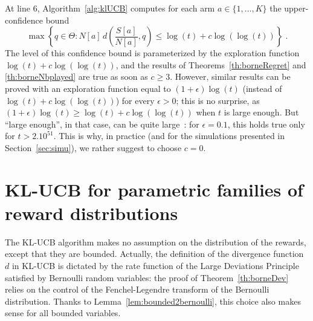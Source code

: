 \documentclass[wcp]{jmlr}
\newcommand{\1}{\mathbbm{1}}
\begin{document}
\begin{remark}
  At line $6$, Algorithm~\ref{alg:klUCB} computes for each arm
  $a\in\{1,\dots,K\}$ the upper-confidence bound
  \[\max\left\{q\in\Theta : N[a] \, d\left( \frac{S[a]}{N[a]}, q \right)
    \leq \log(t) + c\log(\log(t))\right\}\;.\]
  The level of this confidence bound is parameterized by the exploration function $\log(t)+c\log(\log(t))$, and the
  results of Theorems~\ref{th:borneRegret} and \ref{th:borneNbplayed} are true
  as soon as $c\geq3$.  However, similar results can be proved with an exploration function equal to  $(1+\epsilon)\log(t)$ (instead of
  $\log(t)+c\log(\log(t))$) for every $\epsilon>0$; this is no surprise, as
  $(1+\epsilon)\log(t) \geq \log(t)+c\log(\log(t))$ when $t$ is large
  enough. But ``large enough'', in that case, can be quite large~: for
  $\epsilon=0.1$, this holds true only for $t > 2.10^{51}$. This is why, in
  practice (and for the simulations presented in
  Section~\ref{sec:simu}), we rather suggest to choose $c=0$. %
\end{remark}


\section{KL-UCB for parametric families of reward distributions}\label{sec:parametricKLUCB}
The KL-UCB algorithm makes no assumption on the distribution of the rewards,
except that they are bounded. Actually, the definition of the divergence
function $d$ in KL-UCB is dictated by the rate function of the Large Deviations
Principle satisfied by Bernoulli random variables: the proof of
Theorem~\ref{th:borneDev} relies on the control of the Fenchel-Legendre
transform of the Bernoulli distribution. Thanks to
Lemma~\ref{lem:bounded2bernoulli}, this choice also makes sense for all
bounded variables.
\end{document}
